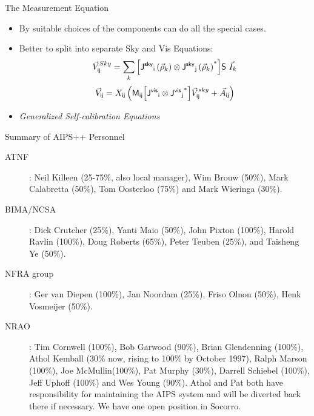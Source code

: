 \begin{slide}{The Measurement Equation}
\begin{itemize}
\begin{itemize}
\item Evaluate predicted coherences $\vvCoh\ssIJ$ if given all terms on right 
hand side,
\item Given observed coherences, construct an image of the Sky Brightness,
\item Solve for other terms on right hand side given observed coherences and
a model for the sky brightness.
\end{itemize}
\item By suitable choices of the components can do all the special
cases.
\item Better to split into separate Sky and Vis Equations:
\begin{equation}
{\vec{V}}^{Sky}_{{\sf i}{\sf j}} = \sum_k {\left[{{\sf J^{sky}}_{{\sf i}}\left({\vec{\rho}}_k\right)}\otimes{{\sf J^{sky}}_{{\sf j}}\left({\vec{\rho}}_k\right)}^\ast\right]} {\sf S} \ {\vec{I}}_k 
\end{equation}
\begin{equation}
{\vec{V}}_{{\sf i}{\sf j}} = {{X}}_{{\sf i}{\sf j}} \left({\sf M}_{{\sf i}{\sf j}} {\left[{{\sf J^{vis}}_{{\sf i}}}\otimes{{\sf J^{vis}}_{{\sf j}}}^\ast\right]} 
{\vec{V}}^{sky}_{{\sf i}{\sf j}} + {\vec{A}}_{{\sf i}{\sf j}} \right)
\end{equation}
\item {\em Generalized Self-calibration Equations}
\end{itemize}
\end{slide}


\begin{slide}{Summary of AIPS++ Personnel}

\begin{description}
\item[ATNF]: Neil Killeen (25-75\%, also local manager), Wim
Brouw (50\%), Mark Calabretta (50\%), Tom Oosterloo (75\%) and Mark
Wieringa (30\%).

\item[BIMA/NCSA]: Dick Crutcher (25\%), Yanti Maio (50\%), John Pixton (100\%),
Harold Ravlin (100\%), Doug Roberts (65\%), Peter Teuben (25\%), and
Taisheng Ye (50\%).  

\item[NFRA group]: Ger van Diepen (100\%), Jan Noordam (25\%), Friso Olnon (50\%), 
Henk Vosmeijer (50\%).

\item[NRAO]: Tim Cornwell (100\%), Bob Garwood (90\%), Brian
Glendenning (100\%), Athol Kemball (30\% now, rising to 100\% by
October 1997), Ralph Marson (100\%), Joe McMullin(100\%), Pat Murphy
(30\%), Darrell Schiebel (100\%), Jeff Uphoff (100\%) and Wes Young
(90\%). Athol and Pat both have responsibility for maintaining the
AIPS system and will be diverted back there if necessary. We have one
open position in Socorro.

\end{description}
\end{slide}

% 
